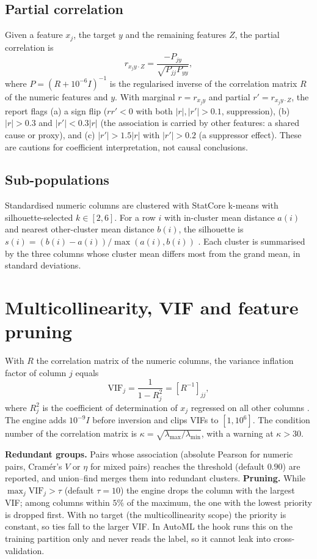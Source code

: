 \documentclass[conference]{IEEEtran}
\begin{document}
\subsection{Partial correlation}
Given a feature $x_j$, the target $y$ and the remaining features $Z$, the partial correlation is
\begin{equation}r_{x_jy\cdot Z}=\frac{-P_{jy}}{\sqrt{P_{jj}P_{yy}}},\end{equation}
where $P=(R+10^{-6}I)^{-1}$ is the regularised inverse of the correlation matrix $R$ of the numeric features and $y$. With marginal $r=r_{x_jy}$ and partial $r'=r_{x_jy\cdot Z}$, the report flags (a) a sign flip ($rr'<0$ with both $|r|,|r'|>0.1$, suppression), (b) $|r|>0.3$ and $|r'|<0.3|r|$ (the association is carried by other features: a shared cause or proxy), and (c) $|r'|>1.5|r|$ with $|r'|>0.2$ (a suppressor effect). These are cautions for coefficient interpretation, not causal conclusions.

\subsection{Sub-populations}
Standardised numeric columns are clustered with StatCore k-means with silhouette-selected $k\in[2,6]$. For a row $i$ with in-cluster mean distance $a(i)$ and nearest other-cluster mean distance $b(i)$, the silhouette is $s(i)=(b(i)-a(i))/\max(a(i),b(i))$ \cite{rousseeuw1987}. Each cluster is summarised by the three columns whose cluster mean differs most from the grand mean, in standard deviations.

\section{Multicollinearity, VIF and feature pruning}\label{sec:vif}
With $R$ the correlation matrix of the numeric columns, the variance inflation factor of column $j$ equals
\begin{equation}\mathrm{VIF}_j=\frac1{1-R_j^2}=[R^{-1}]_{jj},\end{equation}
where $R_j^2$ is the coefficient of determination of $x_j$ regressed on all other columns \cite{belsley1980}. The engine adds $10^{-9}I$ before inversion and clips VIFs to $[1,10^6]$. The condition number of the correlation matrix is $\kappa=\sqrt{\lambda_{\max}/\lambda_{\min}}$, with a warning at $\kappa>30$.

\textbf{Redundant groups.} Pairs whose association (absolute Pearson for numeric pairs, Cram\'er's $V$ or $\eta$ for mixed pairs) reaches the threshold (default $0.90$) are reported, and union--find merges them into redundant clusters. \textbf{Pruning.} While $\max_j\mathrm{VIF}_j>\tau$ (default $\tau=10$) the engine drops the column with the largest VIF; among columns within $5\%$ of the maximum, the one with the lowest priority is dropped first. With no target (the multicollinearity scope) the priority is constant, so ties fall to the larger VIF. In AutoML the hook runs this on the training partition only and never reads the label, so it cannot leak into cross-validation.
\end{document}
